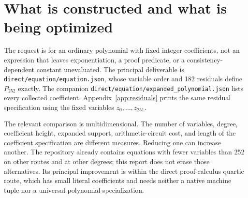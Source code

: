 \documentclass[11pt,letterpaper]{article}
\theoremstyle{remark}\newtheorem{remark}[theorem]{Remark}
\newcommand{\file}[1]{\nolinkurl{#1}}
\begin{document}
\begin{abstract}
We construct a fixed integer quartic whose unsolvability is provably
equivalent in ZFC to the syntactic consistency of ZFC. The construction
uses the repository's direct numerical proof calculus, and does not encode
K215 or specialize Jones's universal polynomial. Its 252 unrestricted
integer variables improve the latest matched direct construction's 282.
The mechanism is a general representation lemma: digit remainders with
different positive divisors are rescaled to one common divisor, and their
separate nonnegativity certificates are replaced by one small Euclidean
norm certificate. A two-stage coefficient bound recovers the factorial
digit before its factorial interpretation is available, and then recovers
the ten range digits. We give constructive soundness and completeness,
the full residual specification, the complete collected polynomial, and
independent finite checks. Separate results complete a previously
conditional radix-$2^{49}$ native coefficient construction and lower the
degrees of compact ten-positive-variable equations by reusing a smaller
carrier denominator. A complemented-label encoding also permits a fully certified radix-$2^{47}$
native tuple, with 207,214 raw coefficient bytes at the unchanged
15-variable, degree-157, 66-operation profile.
\end{abstract}
\tableofcontents
\newpage

\section{What is constructed and what is being optimized}

The request is for an ordinary polynomial with fixed integer coefficients,
not an expression that leaves exponentiation, a proof predicate, or a
consistency-dependent constant unevaluated. The principal deliverable is
\file{direct/equation/equation.json}, whose variable order and 182 residuals define
$P_{252}$ exactly. The companion
\file{direct/equation/expanded_polynomial.json} lists every collected coefficient.
Appendix~\ref{app:residuals} prints the same residual specification using
the fixed variables $z_0,\ldots,z_{251}$.

The relevant comparison is multidimensional. The number of variables,
degree, coefficient height, expanded support, arithmetic-circuit cost,
and length of the coefficient specification are different measures.
Reducing one can increase another. The repository already contains
equations with fewer variables than 252 on other routes and at other
degrees; this report does not erase those alternatives. Its principal
improvement is within the direct proof-calculus quartic route, which has
small literal coefficients and needs neither a native machine tuple nor
a universal-polynomial specialization.
\end{document}
